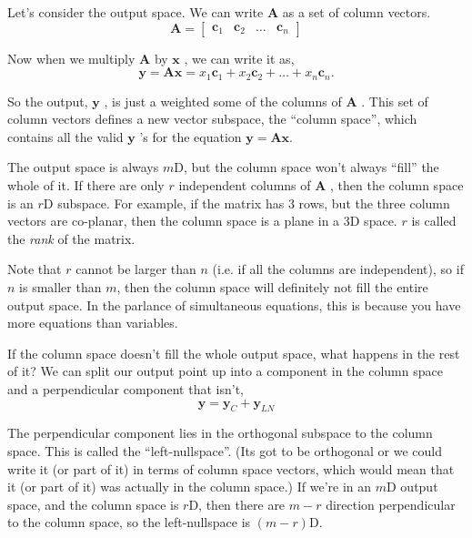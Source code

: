 \documentclass[a4paper,10pt]{article}
\newcommand{\mA}{$\mathbf{A}$ }
\newcommand{\vx}{$\mathbf{x}$ }
\newcommand{\vy}{$\mathbf{y}$ }
\begin{document}
Let's consider the output space. We can write \mA as a set of column vectors.
%
\begin{equation}
 \mathbf{A} = \begin{bmatrix}\mathbf{c}_1 & \mathbf{c}_2 & \dots & \mathbf{c}_n \end{bmatrix}
\end{equation}

Now when we multiply \mA by \vx, we can write it as,
%
\begin{equation}
 \mathbf{y} = \mathbf{A x} = x_1 \mathbf{c}_1 + x_2 \mathbf{c}_2 + \dots + x_n \mathbf{c}_n   .
\end{equation}

So the output, \vy, is just a weighted some of the columns of \mA. This set of column vectors defines a new vector subspace, the ``column space'', which contains all the valid \vy's for the equation $\mathbf{y} = \mathbf{A x}$.

The output space is always $m$D, but the column space won't always ``fill'' the whole of it. If there are only $r$ independent columns of \mA, then the column space is an $r$D subspace. For example, if the matrix has $3$ rows, but the three column vectors are co-planar, then the column space is a plane in a 3D space. $r$ is called the \emph{rank} of the matrix.

Note that $r$ cannot be larger than $n$ (i.e. if all the columns are independent), so if $n$ is smaller than $m$, then the column space will definitely not fill the entire output space. In the parlance of simultaneous equations, this is because you have more equations than variables.
 
If the column space doesn't fill the whole output space, what happens in the rest of it? We can split our output point up into a component in the column space and a perpendicular component that isn't,
%
\begin{equation}
\mathbf{y} = \mathbf{y}_C + \mathbf{y}_{LN}
\end{equation}

The perpendicular component lies in the orthogonal subspace to the column space. This is called the ``left-nullspace''. (Its got to be orthogonal or we could write it (or part of it) in terms of column space vectors, which would mean that it (or part of it) was actually in the column space.) If we're in an $m$D output space, and the column space is $r$D, then there are $m-r$ direction perpendicular to the column space, so the left-nullspace is $(m-r)$D.
\end{document}
